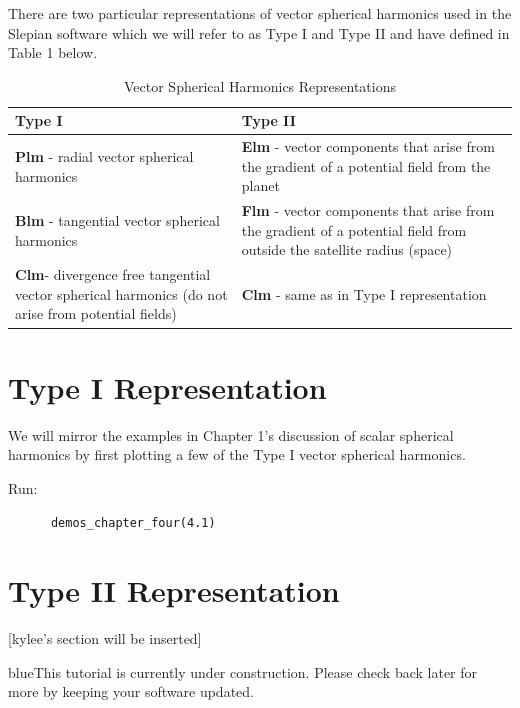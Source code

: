 \documentclass[11pt]{article}
\newcommand{\TAG}{\begin{color}{blue}This tutorial is currently under construction. Please check back later for more by keeping your software updated.\end{color}}
\begin{document}
There are two particular representations of vector spherical harmonics used in the Slepian software which we will refer to as Type I and Type II and have defined in Table 1 below.

\begin{table}[H]
\caption{Vector Spherical Harmonics Representations}
\begin{tabulary}{\linewidth}{L{7cm}|L{8cm}}
\textbf{Type I} & \textbf{Type II} \\ \hline
   \textbf{Plm} - radial vector spherical harmonics & \textbf{Elm} - vector components that arise from the gradient of a potential field from the planet \\
   \textbf{Blm} - tangential vector spherical harmonics & \textbf{Flm} - vector components that arise from the gradient of a potential field from outside the satellite radius (space) \\
   \textbf{Clm}- divergence free tangential vector spherical harmonics (do not arise from potential fields) & \textbf{Clm} - same as in Type I representation
\end{tabulary}
\end{table}

\section{Type I Representation}

We will mirror the examples in Chapter 1's discussion of scalar spherical harmonics by first plotting a few of the Type I vector spherical harmonics.

Run:

\verb|		demos_chapter_four(4.1)|

\section{Type II Representation}


[kylee's section will be inserted] \\

\TAG
\end{document}
